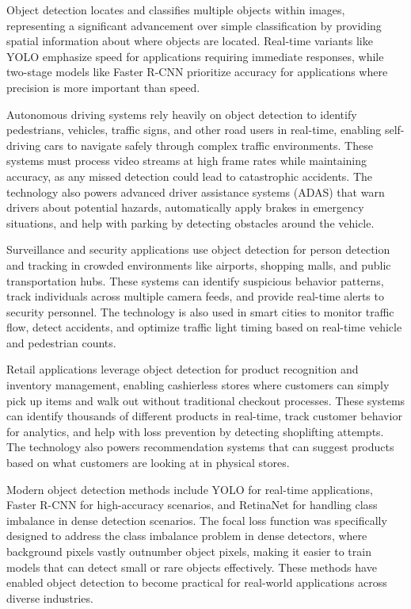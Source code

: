 Object detection locates and classifies multiple objects within images, representing a significant advancement over simple classification by providing spatial information about where objects are located. Real-time variants like YOLO emphasize speed for applications requiring immediate responses, while two-stage models like Faster R-CNN prioritize accuracy for applications where precision is more important than speed.

Autonomous driving systems rely heavily on object detection to identify pedestrians, vehicles, traffic signs, and other road users in real-time, enabling self-driving cars to navigate safely through complex traffic environments. These systems must process video streams at high frame rates while maintaining accuracy, as any missed detection could lead to catastrophic accidents. The technology also powers advanced driver assistance systems (ADAS) that warn drivers about potential hazards, automatically apply brakes in emergency situations, and help with parking by detecting obstacles around the vehicle.

Surveillance and security applications use object detection for person detection and tracking in crowded environments like airports, shopping malls, and public transportation hubs. These systems can identify suspicious behavior patterns, track individuals across multiple camera feeds, and provide real-time alerts to security personnel. The technology is also used in smart cities to monitor traffic flow, detect accidents, and optimize traffic light timing based on real-time vehicle and pedestrian counts.

Retail applications leverage object detection for product recognition and inventory management, enabling cashierless stores where customers can simply pick up items and walk out without traditional checkout processes. These systems can identify thousands of different products in real-time, track customer behavior for analytics, and help with loss prevention by detecting shoplifting attempts. The technology also powers recommendation systems that can suggest products based on what customers are looking at in physical stores.

Modern object detection methods include YOLO for real-time applications, Faster R-CNN for high-accuracy scenarios, and RetinaNet for handling class imbalance in dense detection scenarios. The focal loss function was specifically designed to address the class imbalance problem in dense detectors, where background pixels vastly outnumber object pixels, making it easier to train models that can detect small or rare objects effectively. These methods have enabled object detection to become practical for real-world applications across diverse industries.

